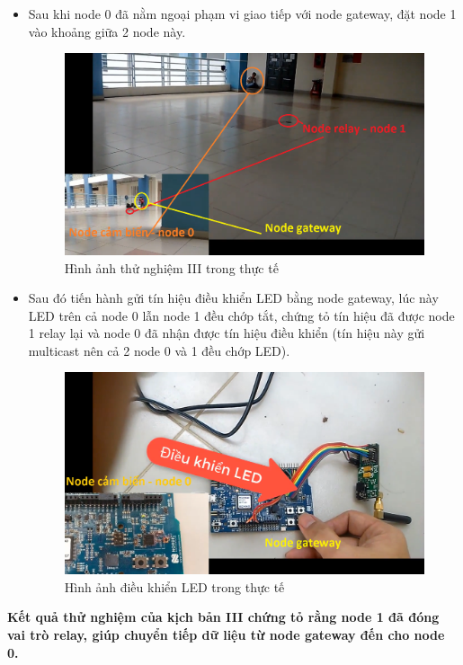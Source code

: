         \begin{itemize}
            
            \item Sau khi node 0 đã nằm ngoại phạm vi giao tiếp với node gateway, đặt node 1 vào khoảng giữa 2 node này.
            \begin{figure}[h!]
	    	 \begin{center}
	    		\includegraphics[scale=0.3]{images/ex3-2.png}
	    		\caption{Hình ảnh thử nghiệm III trong thực tế}
	    	\end{center}
    	\end{figure}
    	\newpage
            \item Sau đó tiến hành gửi tín hiệu điều khiển LED bằng node gateway, lúc này LED trên cả node 0 lẫn node 1 đều chớp tắt, chứng tỏ tín hiệu đã được node 1 relay lại và node 0 đã nhận được tín hiệu điều khiển (tín hiệu này gửi multicast nên cả 2 node 0 và 1 đều chớp LED).
            \begin{figure}[h!]
	    	 \begin{center}
	    		\includegraphics[scale=0.3]{images/ex3-3.png}
	    		\caption{Hình ảnh điều khiển LED trong thực tế}
	    	\end{center}
    	\end{figure}
        \end{itemize}
        \textbf{Kết quả thử nghiệm của kịch bản III chứng tỏ rằng node 1 đã đóng vai trò relay, giúp chuyển tiếp dữ liệu từ node gateway đến cho node 0.}





